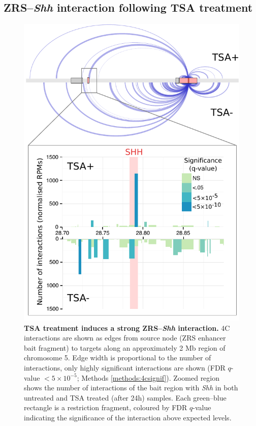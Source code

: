 \documentclass[a4paper,11pt,oneside]{book}
\begin{document}

\subsection{ZRS--\emph{Shh} interaction following TSA treatment}

\begin{figure}
\begin{center} 
\includegraphics[width=5in]{figs/shharc_full.pdf}
\captionsetup{width=\textwidth} 
\caption[TSA treatment induces a strong ZRS--\emph{Shh} interaction. ]{ {\bf TSA treatment induces a strong ZRS--\emph{Shh} interaction. }
4C interactions are shown as edges from source node (ZRS enhancer bait fragment) to targets along an approximately 2 Mb region of chromosome 5. Edge width is proportional to the number of interactions, only highly significant interactions are shown (FDR $q$-value $<5 \times 10 ^{-5}$; Methods \ref{methods:4csignif}). Zoomed region shows the number of interactions of the bait region with \emph{Shh} in both untreated and TSA treated (after 24h) samples. Each green--blue rectangle is a restriction fragment, coloured by FDR $q$-value indicating the significance of the interaction above expected levels.
}\label{fig:ssharc}
\end{center} 
\end{figure} 
\end{document}
